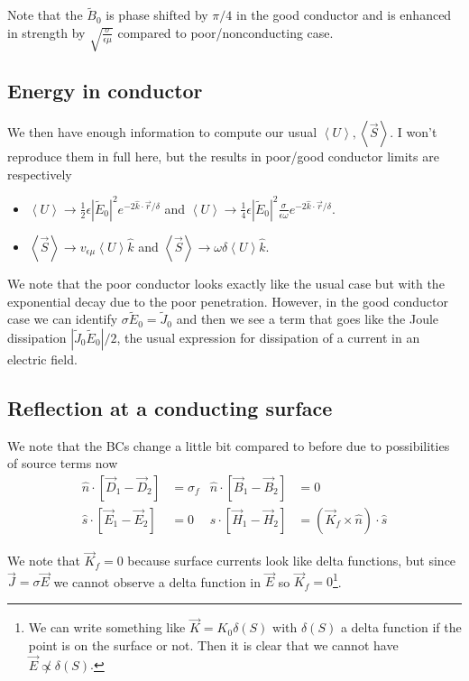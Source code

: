 \documentclass[10pt,twocolumn]{article}
\newcommand{\abs}[1]{\left|#1\right|}
\newcommand{\expvalue}[1]{\left<#1\right>}
\begin{document}
Note that the $\tilde{B}_0$ is phase shifted by $\pi/4$ in the good conductor and is enhanced in strength by $\sqrt{\frac{\sigma}{\epsilon \mu}}$ compared to poor/nonconducting case.

\subsection{Energy in conductor}

We then have enough information to compute our usual $\expvalue{U}, \expvalue{\vec{S}}$. I won't reproduce them in full here, but the results in poor/good conductor limits are respectively
\begin{itemize}
    \item $\expvalue{U} \to \frac{1}{2}\epsilon \abs{\tilde{E}_0}^2 e^{-2\hat{k} \cdot \vec{r}/\delta}$ and $\expvalue{U} \to \frac{1}{4}\epsilon \abs{\tilde{E}_0}^2 \frac{\sigma}{\epsilon \omega}e^{-2\hat{k} \cdot \vec{r}/\delta}$.
    \item $\expvalue{\vec{S}} \to v_{\epsilon \mu}\expvalue{U}\hat{k}$ and $\expvalue{\vec{S}}\to\omega \delta \expvalue{U}\hat{k}$.
\end{itemize}

We note that the poor conductor looks exactly like the usual case but with the exponential decay due to the poor penetration. However, in the good conductor case we can identify $\sigma \tilde{E}_0 = \tilde{J}_0$ and then we see a term that goes like the Joule dissipation $\abs{\tilde{J}_0\tilde{E}_0}/2$, the usual expression for dissipation of a current in an electric field.

\subsection{Reflection at a conducting surface}

We note that the BCs change a little bit compared to before due to possibilities of source terms now
\begin{align}
    \hat{n} \cdot \left[ \vec{D}_1 - \vec{D}_2 \right] &= \sigma_f & \hat{n} \cdot \left[ \vec{B}_1 - \vec{B}_2 \right] &= 0\\
    \hat{s} \cdot \left[ \vec{E}_1 - \vec{E}_2 \right] &= 0 & \hat{s} \cdot \left[ \vec{H}_1 - \vec{H}_2 \right] &= (\vec{K}_f \times \hat{n})\cdot\hat{s}
\end{align}

We note that $\vec{K}_f = 0$ because surface currents look like delta functions, but since $\vec{J} = \sigma \vec{E}$ we cannot observe a delta function in $\vec{E}$ so $\vec{K}_f = 0$\footnote{We can write something like $\vec{K} = K_0 \delta(S)$ with $\delta(S)$ a delta function if the point is on the surface or not. Then it is clear that we cannot have $\vec{E} \not\propto \delta(S)$.}.
\end{document}
